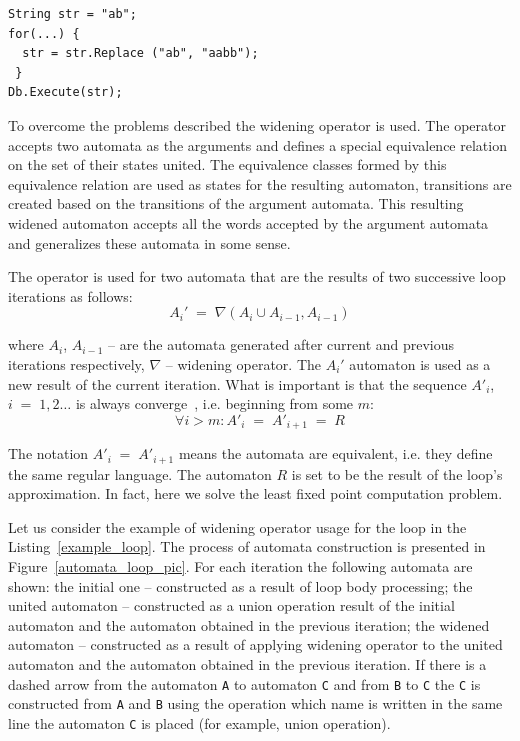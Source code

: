 \documentclass{sig-alternate-05-2015}
\begin{document}
\begin{lstlisting}[label=classic_example,caption=Loop with a replace operation in C\#]
String str = "ab";
for(...) {
  str = str.Replace ("ab", "aabb");
 }     	
Db.Execute(str);
\end{lstlisting}

To overcome the problems described the widening operator is used. The operator accepts two automata as the arguments and defines a special equivalence relation on the set of their states united. The equivalence classes formed by this equivalence relation are used as states for the resulting automaton, transitions are created based on the transitions of the argument automata. This resulting widened automaton accepts all the words accepted by the argument automata and generalizes these automata in some sense.

The operator is used for two automata that are the results of two successive loop iterations as follows:
$$
A_i' \;=\; \nabla (A_i \cup A_{i-1}, A_{i-1})
$$

where $A_i$, $A_{i-1}$ -- are the automata generated after current and previous iterations respectively, $\nabla$ -- widening operator. The $A_i'$ automaton is used as a new result of the current iteration. What is important is that the sequence $A'_i$, $i \;=\; 1, 2 \ldots$ is always converge~\cite{Upper_Approximation:ref}, i.e. beginning from some $m$:
$$
\forall i > m \colon A'_i \;=\; A'_{i+1} \;=\; R
$$

The notation  $A'_i \;=\; A'_{i+1}$ means the automata are equivalent, i.e. they define the same regular language. The automaton $R$ is set to be the result of the loop's approximation. In fact, here we solve the least fixed point computation problem.

Let us consider the example of widening operator usage for the loop in the Listing~\ref{example_loop}. The process of automata construction is presented in Figure~\ref{automata_loop_pic}. For each iteration the following automata are shown: the initial one -- constructed as a result of loop body processing; the united automaton -- constructed as a union operation result of the initial automaton and the automaton obtained in the previous iteration; the widened automaton -- constructed as a result of applying widening operator to the united automaton and  the automaton obtained in the previous iteration. If there is a dashed arrow from the automaton \verb|A| to automaton \verb|C| and from \verb|B| to \verb|C| the \verb|C| is constructed from \verb|A| and \verb|B| using the operation which name is written in the same line the automaton \verb|C| is placed (for example, union operation).
\end{document}
